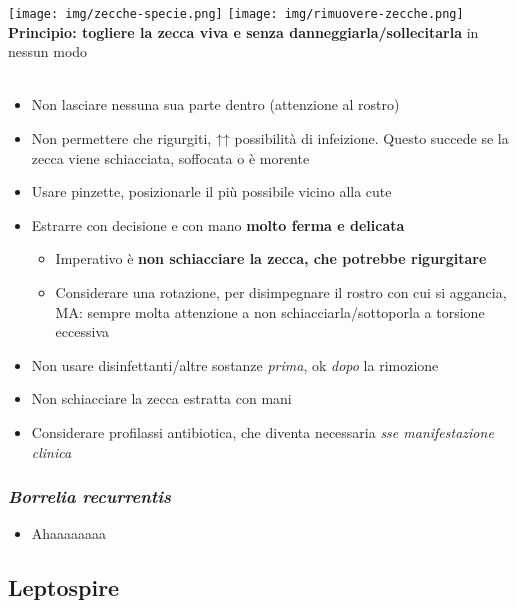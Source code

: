 \documentclass[italian,]{article}
\providecommand{\tightlist}{%
  \setlength{\itemsep}{0pt}\setlength{\parskip}{0pt}}
\newcommand{\greenbox}[2]{\begin{tcolorbox}[title=#1,colback=green!5,colframe=green!35!black]#2\end{tcolorbox}} %
\begin{document}
\greenbox{Come togliere le zecche}{
\texttt{[image: img/zecche-specie.png]}
\texttt{[image: img/rimuovere-zecche.png]}
\\
\textbf{Principio: togliere la zecca viva e senza danneggiarla/sollecitarla} in nessun modo\\
\\
\begin{itemize}
\tightlist
\item Non lasciare nessuna sua parte dentro (attenzione al rostro)
\item Non permettere che rigurgiti, ↑↑ possibilità di infeizione. Questo succede se la zecca viene schiacciata, soffocata o è morente
\item Usare pinzette, posizionarle il più possibile vicino alla cute
\item Estrarre con decisione e con mano \textbf{molto ferma e delicata}

  \begin{itemize}
  \tightlist
  \item Imperativo è \textbf{non schiacciare la zecca, che potrebbe rigurgitare}
  \item Considerare una rotazione, per disimpegnare il rostro con cui si aggancia, MA: sempre molta attenzione a non schiacciarla/sottoporla a torsione eccessiva
  \end{itemize}
\item Non usare disinfettanti/altre sostanze \emph{prima}, ok \emph{dopo} la rimozione
\item Non schiacciare la zecca estratta con mani
\item Considerare profilassi antibiotica, che diventa necessaria \emph{sse manifestazione clinica}
\end{itemize}
}

\hypertarget{borrelia-recurrentis}{%
\subsubsection{\texorpdfstring{\emph{Borrelia
recurrentis}}{Borrelia recurrentis}}\label{borrelia-recurrentis}}

\begin{itemize}
\tightlist
\item
  Ahaaaaaaaa
\end{itemize}

\hypertarget{leptospire}{%
\subsection{Leptospire}\label{leptospire}}
\end{document}
